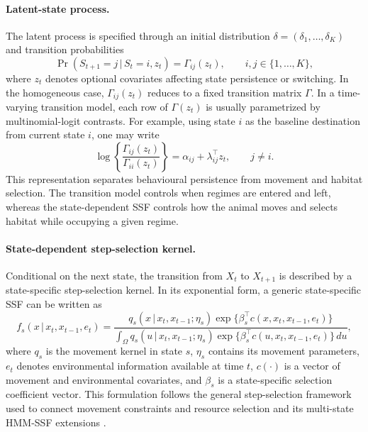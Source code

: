 \documentclass[11pt]{article}
\newcommand{\given}{\,\vert\,}
\begin{document}
\paragraph{Latent-state process.}

The latent process is specified through an initial distribution
$\delta=(\delta_1,\ldots,\delta_K)$ and transition probabilities
\begin{equation*}
  \Pr(S_{t+1}=j \given S_t=i, z_t) = \Gamma_{ij}(z_t),
  \qquad i,j \in \{1,\ldots,K\},
\end{equation*}
where $z_t$ denotes optional covariates affecting state persistence or
switching. In the homogeneous case, $\Gamma_{ij}(z_t)$ reduces to a fixed
transition matrix $\Gamma$. In a time-varying transition model, each row of
$\Gamma(z_t)$ is usually parametrized by multinomial-logit contrasts. For
example, using state $i$ as the baseline destination from current state $i$,
one may write
\begin{equation*}
  \log\left\{\frac{\Gamma_{ij}(z_t)}{\Gamma_{ii}(z_t)}\right\}
  =
  \alpha_{ij} + \lambda_{ij}^{\top} z_t,
  \qquad j \ne i.
\end{equation*}
This representation separates behavioural persistence from movement and
habitat selection. The transition model controls when regimes are entered and
left, whereas the state-dependent SSF controls how the animal moves and selects
habitat while occupying a given regime.

\paragraph{State-dependent step-selection kernel.}

Conditional on the next state, the transition from $X_t$ to $X_{t+1}$ is
described by a state-specific step-selection kernel. In its exponential
form, a generic state-specific SSF can be written as
\begin{equation}
  f_s(x \given x_t, x_{t-1}, e_t)
  =
  \frac{
    q_s(x \given x_t, x_{t-1}; \eta_s)
    \exp\{ \beta_s^\top c(x, x_t, x_{t-1}, e_t) \}
  }{
    \int_{\Omega}
    q_s(u \given x_t, x_{t-1}; \eta_s)
    \exp\{ \beta_s^\top c(u, x_t, x_{t-1}, e_t) \}
    \,du
  },
  \label{eq:ssf-kernel}
\end{equation}
where $q_s$ is the movement kernel in state $s$, $\eta_s$ contains its
movement parameters, $e_t$ denotes environmental information available at time
$t$, $c(\cdot)$ is a vector of movement and environmental covariates, and
$\beta_s$ is a state-specific selection coefficient vector. This formulation
follows the general step-selection framework used to connect movement
constraints and resource selection \citep{forester2009,avgar2016} and its
multi-state HMM-SSF extensions \citep{nicosia2017,klappstein2023}.
\end{document}
